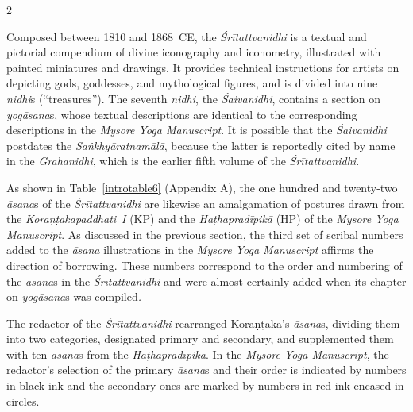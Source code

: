 \begin{nohyp}
\begin{multicols*}{2}
\begin{eng}
Composed between 1810 and 1868~CE, the \emph{Śrītattvanidhi} is a textual and pictorial compendium of divine iconography and iconometry, illustrated with painted miniatures and drawings. It provides technical instructions for artists on depicting gods, goddesses, and mythological figures, and is divided into nine \emph{nidhi}s (``treasures''). The seventh \emph{nidhi}, the \emph{Śaivanidhi}, contains a section on \emph{yogāsana}s, whose textual descriptions are identical to the corresponding descriptions in the \emph{Mysore Yoga Manuscript}. It is possible that the \emph{Śaivanidhi} postdates the \emph{Saṅkhyāratnamālā}, because the latter is reportedly cited by name in the \emph{Grahanidhi}, which is the earlier fifth volume of the \emph{Śrītattvanidhi}.

As shown in Table~\ref{introtable6} (Appendix A), the one hundred and twenty-two \emph{āsana}s of the \emph{Śrītattvanidhi} are likewise an amalgamation of postures drawn from the \emph{Koraṇṭakapaddhati}~\emph{I} (KP) and the \emph{Haṭhapradīpikā} (HP) of the \emph{Mysore Yoga Manuscript}. As discussed in the previous section, the third set of scribal numbers added to the \emph{āsana} illustrations in the \emph{Mysore Yoga Manuscript} affirms the direction of borrowing. These numbers correspond to the order and numbering of the \emph{āsana}s in the \emph{Śrītattvanidhi} and were almost certainly added when its chapter on \emph{yogāsana}s was compiled\emph{.}

The redactor of the \emph{Śrītattvanidhi} rearranged Koraṇṭaka's \emph{āsana}s, dividing them into two categories, designated primary and secondary, and supplemented them with ten \emph{āsana}s from the \emph{Haṭhapradīpikā}. In the \emph{Mysore Yoga Manuscript}, the redactor's selection of the primary \emph{āsana}s and their order is indicated by numbers in black ink and the secondary ones are marked by numbers in red ink encased in circles.


\end{eng}
\end{multicols*}
\end{nohyp}
